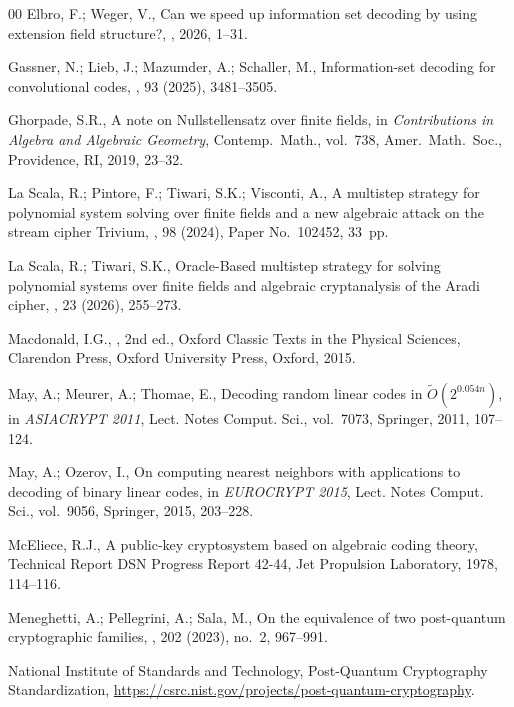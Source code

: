 \documentclass{amsart}
\begin{document}
\begin{thebibliography}{00}
Elbro, F.; Weger, V.,
\newblock Can we speed up information set decoding by using extension field
structure?,
, 2026, 1--31.

Gassner, N.; Lieb, J.; Mazumder, A.; Schaller, M.,
\newblock Information-set decoding for convolutional codes,
, 93 (2025), 3481--3505.

Ghorpade, S.R.,
\newblock A note on Nullstellensatz over finite fields,
\newblock in {\em Contributions in Algebra and Algebraic Geometry},
Contemp.\ Math., vol.~738, Amer.\ Math.\ Soc., Providence, RI, 2019,
23--32.

La Scala, R.; Pintore, F.; Tiwari, S.K.; Visconti, A.,
\newblock A multistep strategy for polynomial system solving over finite
fields and a new algebraic attack on the stream cipher Trivium,
, 98 (2024), Paper No.~102452, 33~pp.

La Scala, R.; Tiwari, S.K.,
\newblock Oracle-Based multistep strategy for solving polynomial systems
over finite fields and algebraic cryptanalysis of the Aradi cipher,
, 23 (2026), 255--273.

Macdonald, I.G.,
, 2nd ed.,
\newblock Oxford Classic Texts in the Physical Sciences,
Clarendon Press, Oxford University Press, Oxford, 2015.

May, A.; Meurer, A.; Thomae, E.,
\newblock Decoding random linear codes in $\widetilde{O}(2^{0.054n})$,
\newblock in {\em ASIACRYPT 2011}, Lect. Notes Comput. Sci.,
vol.~7073, Springer, 2011, 107--124.

May, A.; Ozerov, I.,
\newblock On computing nearest neighbors with applications to decoding of
binary linear codes,
\newblock in {\em EUROCRYPT 2015}, Lect. Notes Comput. Sci.,
vol.~9056, Springer, 2015, 203--228.

McEliece, R.J.,
\newblock A public-key cryptosystem based on algebraic coding theory,
\newblock Technical Report DSN Progress Report 42-44,
Jet Propulsion Laboratory, 1978, 114--116.

Meneghetti, A.; Pellegrini, A.; Sala, M.,
\newblock On the equivalence of two post-quantum cryptographic families,
, 202 (2023), no.~2, 967--991.

National Institute of Standards and Technology,
\newblock Post-Quantum Cryptography Standardization,
\newblock \url{https://csrc.nist.gov/projects/post-quantum-cryptography}.


\end{thebibliography}
\end{document}
